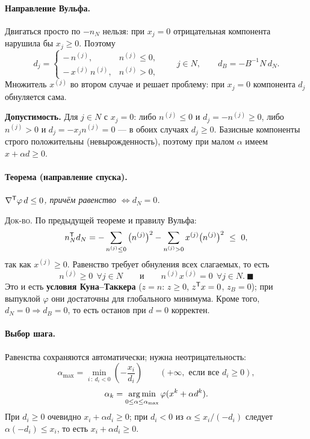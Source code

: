 \paragraph{Направление Вульфа.}
Двигаться просто по $-n_N$ нельзя: при $x_j = 0$ отрицательная компонента
нарушила бы $x_j \ge 0$. Поэтому
\[
  d_j =
  \begin{cases}
    -\,n^{(j)} , & n^{(j)} \le 0 , \\[2pt]
    -\,x^{(j)}\,n^{(j)} , & n^{(j)} > 0 ,
  \end{cases}
  \qquad j \in N ,
  \qquad d_B = -B^{-1}N\,d_N .
\]
Множитель $x^{(j)}$ во втором случае и решает проблему: при $x_j = 0$
компонента $d_j$ обнуляется сама.

\textbf{Допустимость.} Для $j \in N$ с $x_j = 0$: либо $n^{(j)} \le 0$ и
$d_j = -n^{(j)} \ge 0$, либо $n^{(j)} > 0$ и $d_j = -x_jn^{(j)} = 0$ — в
обоих случаях $d_j \ge 0$. Базисные компоненты строго положительны
(невырожденность), поэтому при малом $\alpha$ имеем $x + \alpha d \ge 0$.

\paragraph{Теорема (направление спуска).}
\textit{$\nabla^{\mathsf{T}}\varphi\,d \le 0$, причём равенство $\iff d_N = 0$.}

\textsc{Док-во.} По предыдущей теореме и правилу Вульфа:
\[
  n_N^{\mathsf{T}} d_N
   = -\sum_{n^{(j)} \le 0}\big(n^{(j)}\big)^2
     - \sum_{n^{(j)} > 0} x^{(j)}\big(n^{(j)}\big)^2 \ \le\ 0 ,
\]
так как $x^{(j)} \ge 0$. Равенство требует обнуления всех слагаемых, то есть
\[
  n^{(j)} \ge 0 \ \ \forall j \in N
  \qquad\text{и}\qquad
  n^{(j)}x^{(j)} = 0 \ \ \forall j \in N . \ \blacksquare
\]
Это и есть \textbf{условия Куна--Таккера} ($z = n$: $z \ge 0$, $z^{\mathsf{T}} x = 0$,
$z_B = 0$); при выпуклой $\varphi$ они достаточны для глобального минимума.
Кроме того, $d_N = 0 \Rightarrow d_B = 0$, то есть останов при $d = 0$
корректен.

\paragraph{Выбор шага.}
Равенства сохраняются автоматически; нужна неотрицательность:
\[
  \alpha_{\max} = \min_{i\,:\ d_i < 0}\left(-\frac{x_i}{d_i}\right)
  \qquad (+\infty, \text{ если все } d_i \ge 0) ,
\]
\[
  \alpha_k = \operatorname*{arg\,min}_{0 \le \alpha \le \alpha_{\max}}
    \varphi(x^k + \alpha d^k) .
\]
При $d_i \ge 0$ очевидно $x_i + \alpha d_i \ge 0$; при $d_i < 0$ из
$\alpha \le x_i/(-d_i)$ следует $\alpha(-d_i) \le x_i$, то есть
$x_i + \alpha d_i \ge 0$.

